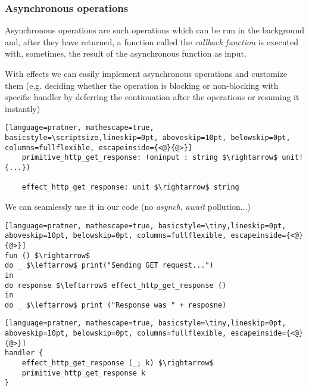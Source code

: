 \documentclass[t]{beamer}
\begin{document}
\begin{frame}[fragile]
	\frametitle{Asynchronous operations}
	Asynchronous operations are such operations which can be run in the background and, after they have returned, a function called the \textit{callback function} is executed with, sometimes, the result of the asynchronous function as input.
	
	With effects we can easily implement asynchronous operations and customize them (e.g. deciding whether the operation is blocking or non-blocking with specific handler by deferring the continuation after the operations or resuming it instantly) 
	

	\begin{lstlisting}[language=pratner, mathescape=true, basicstyle=\scriptsize,lineskip=0pt, aboveskip=10pt, belowskip=0pt, columns=fullflexible, escapeinside={<@}{@>}]
	primitive_http_get_response: (oninput : string $\rightarrow$ unit!{...})
	
	effect_http_get_response: unit $\rightarrow$ string
	\end{lstlisting}  
	We can seamlessly use it in our code (no \textit{asynch}, \textit{await} pollution...)
	
	\begin{multicols}{2}
		\begin{lstlisting}[language=pratner, mathescape=true, basicstyle=\tiny,lineskip=0pt, aboveskip=10pt, belowskip=0pt, columns=fullflexible, escapeinside={<@}{@>}]
fun () $\rightarrow$
do _ $\leftarrow$ print("Sending GET request...") 
in
do response $\leftarrow$ effect_http_get_response ()
in
do _ $\leftarrow$ print ("Response was " + resposne)
		\end{lstlisting}  
		
		\columnbreak
		
		\begin{lstlisting}[language=pratner, mathescape=true, basicstyle=\tiny,lineskip=0pt, aboveskip=10pt, belowskip=0pt, columns=fullflexible, escapeinside={<@}{@>}]
handler {
	effect_http_get_response (_; k) $\rightarrow$
	primitive_http_get_response k
}

		\end{lstlisting}
	\end{multicols}
	
\end{frame}
\end{document}
